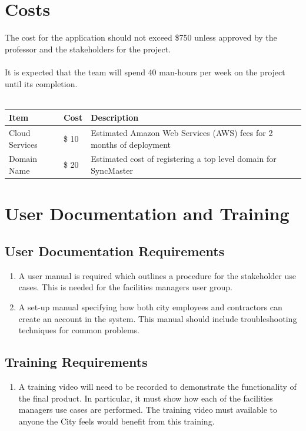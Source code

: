 \documentclass[12pt]{article}
\begin{document}
\newpage{}
\section{Costs}
The cost for the application should not exceed \$750 unless approved
by the professor and the stakeholders for the project.\\
\\
It is expected that the team will spend 40 man-hours per week on the
project until its completion.\\
\\
\begin{tabularx}{\textwidth}{p{3cm}p{2cm}X}
  \toprule {\textbf{Item}} & {\textbf{Cost}} & {\textbf{Description}}\\
  \midrule
  Cloud Services   & \$ 10     & Estimated Amazon Web Services (AWS) fees for 2 months of deployment\\
  Domain Name      & \$ 20     & Estimated cost of registering a top level domain for SyncMaster           \\
  \bottomrule
\end{tabularx}

\section{User Documentation and Training}
\subsection{User Documentation Requirements}
\begin{enumerate} [{UDT-DR}1.]
  \item A user manual is required which outlines a procedure for the stakeholder
    use cases. This is needed for the facilities managers user group.
  \item A set-up manual specifying how both city employees and contractors
    can create an account in the system. This manual should include
    troubleshooting techniques for common problems.
\end{enumerate}

\subsection{Training Requirements}
\begin{enumerate} [{UDT-TR}1.]
  \item A training video will need to be recorded to demonstrate the
    functionality of the final product. In particular, it must show how each of
    the facilities managers use cases are performed. The training
    video must available to
    anyone the City feels would benefit from this training.
\end{enumerate}
\end{document}
